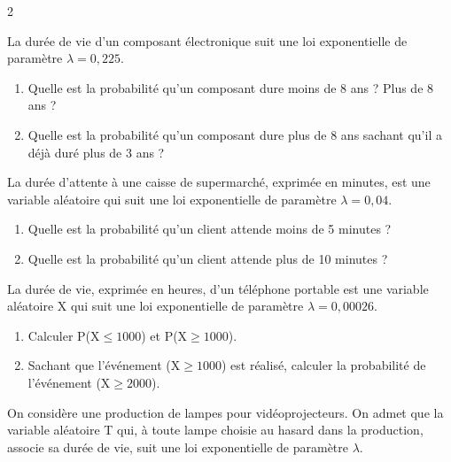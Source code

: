 \def\level{BTS}  %
\def\course{CIEL 2}
\def\chaptername{Lois continues} %
\def\docpart{Loi exponentielle~--~Exercices} %
\def\docname{C2253}        %

\pagestyle{cours_FP}
\makeheaderBTS{} %

\begin{multicols}{2}
\begin{exercice_cours}[\quad]{}
La durée de vie d'un composant électronique suit une loi exponentielle de paramètre $\lambda=0,225$.

\begin{enumerate}
	\item Quelle est la probabilité qu'un composant dure moins de 8 ans ? Plus de 8 ans ?
	\item Quelle est la probabilité qu'un composant dure plus de 8 ans sachant qu'il a déjà duré plus de 3 ans ?
\end{enumerate}


\end{exercice_cours}
\begin{exercice_cours}[\quad]{}
La durée d'attente à une caisse de supermarché, exprimée en minutes, est une variable aléatoire qui suit une loi exponentielle de paramètre $\lambda=0,04$.

\begin{enumerate}
	\item Quelle est la probabilité qu'un client attende moins de 5 minutes ?
	\item Quelle est la probabilité qu'un client attende plus de 10 minutes ?
\end{enumerate}

\end{exercice_cours}
\begin{exercice_cours}[\quad]{}
La durée de vie, exprimée en heures, d'un téléphone portable est une variable aléatoire X qui suit une loi exponentielle de paramètre $\lambda=0,00026$.

\begin{enumerate}
	\item Calculer P(X$\leq 1000$) et P(X$\geq 1000$).
	\item Sachant que l'événement (X$\geq 1000$) est réalisé, calculer la probabilité de l'événement (X$\geq 2000$).
\end{enumerate}

\end{exercice_cours}
\begin{exercice_cours}[\quad]{}
On considère une production de lampes pour vidéoprojecteurs. On admet que la variable aléatoire T qui, à toute lampe choisie au hasard dans la production, associe sa durée de vie, suit une loi exponentielle de paramètre $\lambda$.


\end{exercice_cours}
\end{multicols}
